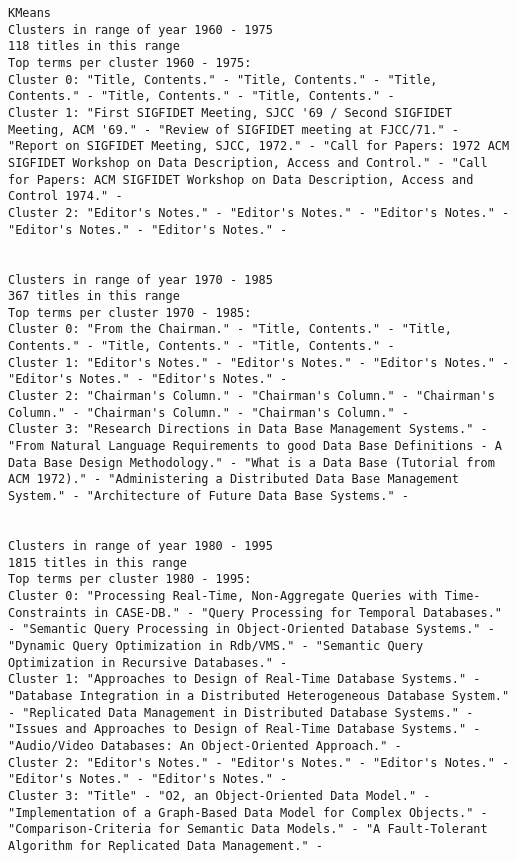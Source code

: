 \documentclass[11pt]{article}
\begin{document}
\begin{verbatim}
KMeans
Clusters in range of year 1960 - 1975
118 titles in this range
Top terms per cluster 1960 - 1975:
Cluster 0: "Title, Contents." - "Title, Contents." - "Title, Contents." - "Title, Contents." - "Title, Contents." - 
Cluster 1: "First SIGFIDET Meeting, SJCC '69 / Second SIGFIDET Meeting, ACM '69." - "Review of SIGFIDET meeting at FJCC/71." - "Report on SIGFIDET Meeting, SJCC, 1972." - "Call for Papers: 1972 ACM SIGFIDET Workshop on Data Description, Access and Control." - "Call for Papers: ACM SIGFIDET Workshop on Data Description, Access and Control 1974." - 
Cluster 2: "Editor's Notes." - "Editor's Notes." - "Editor's Notes." - "Editor's Notes." - "Editor's Notes." - 


Clusters in range of year 1970 - 1985
367 titles in this range
Top terms per cluster 1970 - 1985:
Cluster 0: "From the Chairman." - "Title, Contents." - "Title, Contents." - "Title, Contents." - "Title, Contents." - 
Cluster 1: "Editor's Notes." - "Editor's Notes." - "Editor's Notes." - "Editor's Notes." - "Editor's Notes." - 
Cluster 2: "Chairman's Column." - "Chairman's Column." - "Chairman's Column." - "Chairman's Column." - "Chairman's Column." - 
Cluster 3: "Research Directions in Data Base Management Systems." - "From Natural Language Requirements to good Data Base Definitions - A Data Base Design Methodology." - "What is a Data Base (Tutorial from ACM 1972)." - "Administering a Distributed Data Base Management System." - "Architecture of Future Data Base Systems." - 


Clusters in range of year 1980 - 1995
1815 titles in this range
Top terms per cluster 1980 - 1995:
Cluster 0: "Processing Real-Time, Non-Aggregate Queries with Time-Constraints in CASE-DB." - "Query Processing for Temporal Databases." - "Semantic Query Processing in Object-Oriented Database Systems." - "Dynamic Query Optimization in Rdb/VMS." - "Semantic Query Optimization in Recursive Databases." - 
Cluster 1: "Approaches to Design of Real-Time Database Systems." - "Database Integration in a Distributed Heterogeneous Database System." - "Replicated Data Management in Distributed Database Systems." - "Issues and Approaches to Design of Real-Time Database Systems." - "Audio/Video Databases: An Object-Oriented Approach." - 
Cluster 2: "Editor's Notes." - "Editor's Notes." - "Editor's Notes." - "Editor's Notes." - "Editor's Notes." - 
Cluster 3: "Title" - "O2, an Object-Oriented Data Model." - "Implementation of a Graph-Based Data Model for Complex Objects." - "Comparison-Criteria for Semantic Data Models." - "A Fault-Tolerant Algorithm for Replicated Data Management." - 



\end{verbatim}
\end{document}
